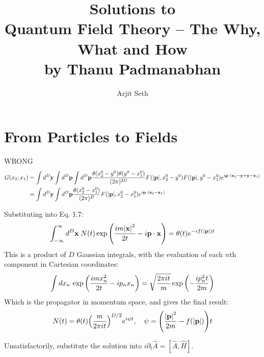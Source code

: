 \documentclass{report}
\begin{document}
\title{Solutions to \\ Quantum Field Theory -- The Why, What and How \\ by Thanu Padmanabhan}

\author{Arjit Seth}

\maketitle

\chapter{From Particles to Fields}
\begin{subquests}
    \item WRONG \begin{align*}
        G(x_2;x_1) & = \int d^D\vb{y} \int d^D\vb{p} \int d^D\vb{p} \frac{\theta(x_2^0 - y^0)\theta(y^0 - x_1^0)}{(2\pi)^{2D}}F(\abs{\vb p}, x_2^0 - y^0)F(\abs{\vb p}, y^0 - x_1^0)e^{i\vb p \cdot(\vb x_2 - \vb y + \vb y - \vb x_1)} \\
        & = \int d^D\vb{y} \int d^D\vb{p} \frac{\theta(x_2^0 - x_1^0)}{(2\pi)^{D}}F(\abs{\vb p}, x_2^0 - x_1^0)e^{i\vb p \cdot(\vb x_2 - \vb x_1)}
    \end{align*}
    \item Substituting into Eq. 1.7: \begin{gather*}
        \int_{-\infty}^{\infty} d^D \vb x\;N(t)\exp\pqty{\frac{im\abs{\vb x}^2}{2t} - i\vb p \cdot \vb x} = \theta(t)e^{-if(\abs {\vb p})t}
    \end{gather*}
    This is a product of $D$ Gaussian integrals, with the evaluation of each $n$th component in Cartesian coordinates:
    \begin{gather*}
        \int dx_n\, \exp\pqty{\frac{imx_n^2}{2t} - ip_nx_n} = \sqrt{\frac{2\pi i t}{m}}\exp\pqty{-\frac{ip_n^2t}{2m}}
    \end{gather*}
    Which is the propagator in momentum space, and gives the final result:
    \begin{gather*}
        N(t) = \theta(t)\pqty{\frac{m}{2\pi i t}}^{D/2}e^{i\psi t}, \quad \psi = \pqty{\frac{\abs{\vb p}^2}{2m} - f(\abs{\vb p})}t
    \end{gather*}
    \item Unsatisfactorily, substitute the solution into $i\partial_t \hat A = [\hat A, \hat H]$.

\end{subquests}
\end{document}
